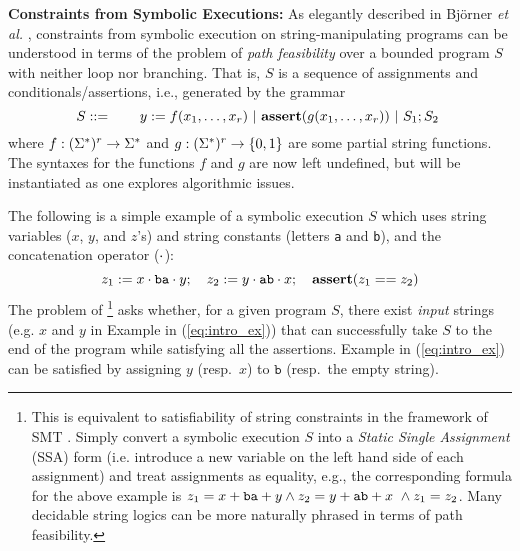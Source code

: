 \smallskip
\noindent
\textbf{Constraints from Symbolic Executions: }
As elegantly described in Bj\"{o}rner \emph{et al.} \cite{BTV09}, constraints 
from symbolic 
execution on string-manipulating programs can be understood in terms of the
problem of \emph{path 
feasibility} over a bounded program $S$ with neither loop nor
branching. %
That is, $S$ is a sequence of assignments and conditionals/assertions, i.e., 
generated by the grammar
\begin{equation} 
    S ::= \qquad y := f(x_1,\ldots,x_\arity) \ |\
    \text{\ASSERT{$g(x_1,\ldots,x_\arity)$}}\ |\ 
            S_1; S_2\ 
            \label{eq:symbex}
\end{equation}
where $f: (\Sigma^*)^r \to \Sigma^*$ and $g: (\Sigma^*)^r \to \{0,1\}$ are
some partial string functions. 
The syntaxes for the functions $f$ and $g$ are now
left undefined, but will be instantiated as one explores algorithmic issues.

The following is a simple example of a symbolic execution $S$
which uses string variables ($x$, $y$, and $z$'s) and string constants
(letters \texttt{a} and \texttt{b}), and the concatenation operator ($\cdot$):
\begin{equation}
        z_1 := x \cdot \text{\texttt{ba}} \cdot y;\quad 
        z_2 := y \cdot \text{\texttt{ab}} \cdot x;\quad
        \textbf{assert}(z_1 == z_2)
        \label{eq:intro_ex}
\end{equation}
The problem of \footnote{
    This is equivalent to 
satisfiability of string constraints in the framework of SMT
\cite{SMT-CACM,SMT-chapter,KS08}.
Simply convert a symbolic execution $S$ 
into a \emph{Static Single Assignment} (SSA) form (i.e. introduce a new 
variable 
on the left hand side of each assignment) and treat assignments as equality,
e.g., the corresponding formula for the above example is
        $z_1 = x + \text{\texttt{ba}} + y \wedge
        z_2 = y + \text{\texttt{ab}} + x\ \wedge
        z_1 = z_2$.
Many decidable string logics can be more naturally phrased in terms of
path feasibility.}
asks whether, for a given program $S$, there exist \emph{input} strings (e.g.
$x$ and $y$ in Example in (\ref{eq:intro_ex}))
that can successfully take
$S$ to the end of the program while satisfying all the assertions. 
Example in (\ref{eq:intro_ex}) can be satisfied by
assigning $y$ (resp.~$x$) to $\texttt{b}$ (resp.~the empty string). 


